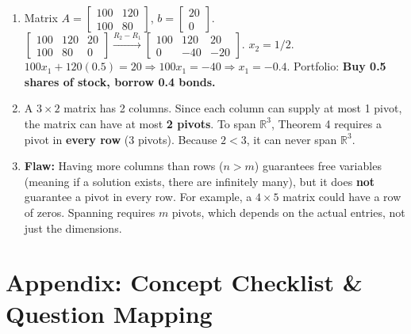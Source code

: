 \documentclass[12pt]{article}
\begin{document}
\begin{enumerate}
    \item Matrix $A = \begin{bmatrix} 100 & 120 \\ 100 & 80 \end{bmatrix}$, $b = \begin{bmatrix} 20 \\ 0 \end{bmatrix}$. $\begin{bmatrix} 100 & 120 & 20 \\ 100 & 80 & 0 \end{bmatrix} \xrightarrow{R_2-R_1} \begin{bmatrix} 100 & 120 & 20 \\ 0 & -40 & -20 \end{bmatrix}$. $x_2 = 1/2$. $100x_1 + 120(0.5) = 20 \Rightarrow 100x_1 = -40 \Rightarrow x_1 = -0.4$. Portfolio: \textbf{Buy 0.5 shares of stock, borrow 0.4 bonds.}
    \item A $3 \times 2$ matrix has 2 columns. Since each column can supply at most 1 pivot, the matrix can have at most \textbf{2 pivots}. To span $\mathbb{R}^3$, Theorem 4 requires a pivot in \textbf{every row} (3 pivots). Because $2 < 3$, it can never span $\mathbb{R}^3$.
    \item \textbf{Flaw:} Having more columns than rows ($n > m$) guarantees free variables (meaning if a solution exists, there are infinitely many), but it does \textbf{not} guarantee a pivot in every row. For example, a $4 \times 5$ matrix could have a row of zeros. Spanning requires $m$ pivots, which depends on the actual entries, not just the dimensions.
\end{enumerate}

\newpage

\section{Appendix: Concept Checklist \& Question Mapping}
\end{document}
